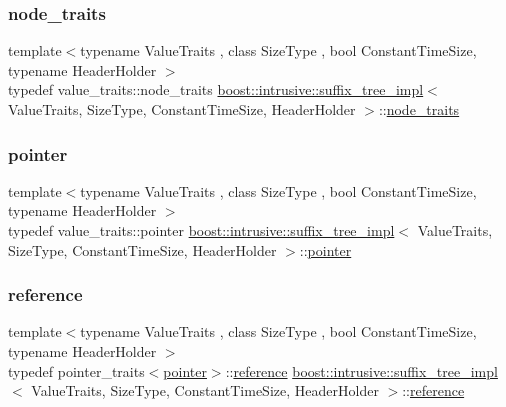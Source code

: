 \subsubsection{\texorpdfstring{node\+\_\+traits}{node\_traits}}
{\footnotesize\ttfamily template$<$typename Value\+Traits , class Size\+Type , bool Constant\+Time\+Size, typename Header\+Holder $>$ \\
typedef value\+\_\+traits\+::node\+\_\+traits \hyperlink{classboost_1_1intrusive_1_1suffix__tree__impl}{boost\+::intrusive\+::suffix\+\_\+tree\+\_\+impl}$<$ Value\+Traits, Size\+Type, Constant\+Time\+Size, Header\+Holder $>$\+::\hyperlink{classboost_1_1intrusive_1_1suffix__tree__impl_a4fac695b2c8ea16789711a9840af44c4}{node\+\_\+traits}}

\mbox{\label{classboost_1_1intrusive_1_1suffix__tree__impl_af8ad26e95f6cc7ba4a814d02eb8f4320}} 
\subsubsection{\texorpdfstring{pointer}{pointer}}
{\footnotesize\ttfamily template$<$typename Value\+Traits , class Size\+Type , bool Constant\+Time\+Size, typename Header\+Holder $>$ \\
typedef value\+\_\+traits\+::pointer \hyperlink{classboost_1_1intrusive_1_1suffix__tree__impl}{boost\+::intrusive\+::suffix\+\_\+tree\+\_\+impl}$<$ Value\+Traits, Size\+Type, Constant\+Time\+Size, Header\+Holder $>$\+::\hyperlink{classboost_1_1intrusive_1_1suffix__tree__impl_af8ad26e95f6cc7ba4a814d02eb8f4320}{pointer}}

\mbox{\label{classboost_1_1intrusive_1_1suffix__tree__impl_af66898eb8c69a952f6a92f6c6b704bed}} 
\subsubsection{\texorpdfstring{reference}{reference}}
{\footnotesize\ttfamily template$<$typename Value\+Traits , class Size\+Type , bool Constant\+Time\+Size, typename Header\+Holder $>$ \\
typedef pointer\+\_\+traits$<$\hyperlink{classboost_1_1intrusive_1_1suffix__tree__impl_af8ad26e95f6cc7ba4a814d02eb8f4320}{pointer}$>$\+::\hyperlink{classboost_1_1intrusive_1_1suffix__tree__impl_af66898eb8c69a952f6a92f6c6b704bed}{reference} \hyperlink{classboost_1_1intrusive_1_1suffix__tree__impl}{boost\+::intrusive\+::suffix\+\_\+tree\+\_\+impl}$<$ Value\+Traits, Size\+Type, Constant\+Time\+Size, Header\+Holder $>$\+::\hyperlink{classboost_1_1intrusive_1_1suffix__tree__impl_af66898eb8c69a952f6a92f6c6b704bed}{reference}}


